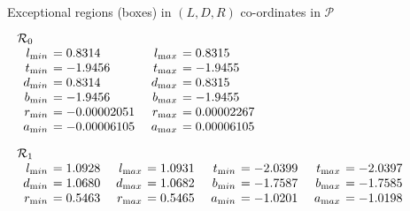 \begin{remark}
\begin{table}\label{GMT tab 1.2}
\caption{Exceptional regions (boxes) in $(L,D,R)$ co-ordinates in ${\mathcal P}$}
\begin{small}
$$
\begin{array}{rlrl}
\noalign{\noindent  ${\mathcal R}_0$}
\noalign{\vskip2pt}
l_{\textrm min} &\hskip-6pt =  0.8314&\enspace    l_{\textrm max}&\hskip-6pt  = 0.8315\\
t_{\textrm min} &\hskip-6pt =  -1.9456&\enspace    t_{\textrm max}&\hskip-6pt  = -1.9455\\
d_{\textrm min} &\hskip-6pt =  0.8314&  d_{\mathrm
max}&\hskip-6pt  = 0.8315\\   b_{\textrm min} &\hskip-6pt =  -1.9456&  b_{\textrm max} &\hskip-6pt = -1.9455\\
r_{\textrm min} &\hskip-6pt =  -0.00002051&  r_{\textrm max} &\hskip-6pt = 0.00002267\\  a_{\textrm min} &\hskip-6pt =  -0.00006105&  a_{\mathrm
max}&\hskip-6pt  = 0.00006105\end{array}
$$



$$\begin{array}{rlrlrlrl}
\noalign{\noindent  ${\mathcal R}_1$}
\noalign{\vskip2pt}
l_{\textrm min} &\hskip-6pt =  1.0928&\enspace    l_{\textrm max} &\hskip-6pt = 1.0931&\enspace   
t_{\textrm min} &\hskip-6pt =  -2.0399&\enspace   t_{\textrm max}&\hskip-6pt  = -2.0397\\
d_{\textrm min} &\hskip-6pt =  1.0680&  d_{\mathrm
max}&\hskip-6pt  = 1.0682&   b_{\textrm min} &\hskip-6pt =  -1.7587&  b_{\textrm max} &\hskip-6pt = -1.7585\\
r_{\textrm min} &\hskip-6pt =  0.5463& 
r_{\textrm max}&\hskip-6pt  = 0.5465&   a_{\textrm min} &\hskip-6pt =  -1.0201&  a_{\textrm max}&\hskip-6pt  = -1.0198\end{array}$$


\end{small}
\end{table}
\end{remark}
